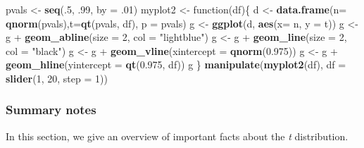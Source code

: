 \documentclass[]{article}
\newenvironment{Shaded}{\begin{snugshade}}{\end{snugshade}}
\newcommand{\KeywordTok}[1]{\textcolor[rgb]{0.13,0.29,0.53}{\textbf{{#1}}}}
\newcommand{\DataTypeTok}[1]{\textcolor[rgb]{0.13,0.29,0.53}{{#1}}}
\newcommand{\DecValTok}[1]{\textcolor[rgb]{0.00,0.00,0.81}{{#1}}}
\newcommand{\FloatTok}[1]{\textcolor[rgb]{0.00,0.00,0.81}{{#1}}}
\newcommand{\StringTok}[1]{\textcolor[rgb]{0.31,0.60,0.02}{{#1}}}
\newcommand{\NormalTok}[1]{{#1}}
\begin{document}
\begin{Shaded}
\begin{Highlighting}[]
\NormalTok{pvals <-}\StringTok{ }\KeywordTok{seq}\NormalTok{(.}\DecValTok{5}\NormalTok{, .}\DecValTok{99}\NormalTok{, }\DataTypeTok{by =} \NormalTok{.}\DecValTok{01}\NormalTok{)}
\NormalTok{myplot2 <-}\StringTok{ }\NormalTok{function(df)\{}
  \NormalTok{d <-}\StringTok{ }\KeywordTok{data.frame}\NormalTok{(}\DataTypeTok{n=} \KeywordTok{qnorm}\NormalTok{(pvals),}\DataTypeTok{t=}\KeywordTok{qt}\NormalTok{(pvals, df),}
                  \DataTypeTok{p =} \NormalTok{pvals)}
  \NormalTok{g <-}\StringTok{ }\KeywordTok{ggplot}\NormalTok{(d, }\KeywordTok{aes}\NormalTok{(}\DataTypeTok{x=} \NormalTok{n, }\DataTypeTok{y =} \NormalTok{t))}
  \NormalTok{g <-}\StringTok{ }\NormalTok{g +}\StringTok{ }\KeywordTok{geom_abline}\NormalTok{(}\DataTypeTok{size =} \DecValTok{2}\NormalTok{, }\DataTypeTok{col =} \StringTok{"lightblue"}\NormalTok{)}
  \NormalTok{g <-}\StringTok{ }\NormalTok{g +}\StringTok{ }\KeywordTok{geom_line}\NormalTok{(}\DataTypeTok{size =} \DecValTok{2}\NormalTok{, }\DataTypeTok{col =} \StringTok{"black"}\NormalTok{)}
  \NormalTok{g <-}\StringTok{ }\NormalTok{g +}\StringTok{ }\KeywordTok{geom_vline}\NormalTok{(}\DataTypeTok{xintercept =} \KeywordTok{qnorm}\NormalTok{(}\FloatTok{0.975}\NormalTok{))}
  \NormalTok{g <-}\StringTok{ }\NormalTok{g +}\StringTok{ }\KeywordTok{geom_hline}\NormalTok{(}\DataTypeTok{yintercept =} \KeywordTok{qt}\NormalTok{(}\FloatTok{0.975}\NormalTok{, df))}
  \NormalTok{g}
\NormalTok{\}}
\KeywordTok{manipulate}\NormalTok{(}\KeywordTok{myplot2}\NormalTok{(df), }\DataTypeTok{df =} \KeywordTok{slider}\NormalTok{(}\DecValTok{1}\NormalTok{, }\DecValTok{20}\NormalTok{, }\DataTypeTok{step =} \DecValTok{1}\NormalTok{))}
\end{Highlighting}
\end{Shaded}

\subsubsection{Summary notes}\label{summary-notes-5}

In this section, we give an overview of important facts about the
\emph{t} distribution.
\end{document}
